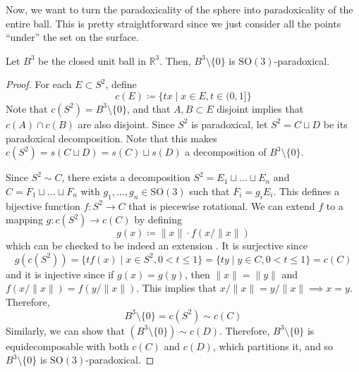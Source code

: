   Now, we want to turn the paradoxicality of the sphere into paradoxicality of the entire ball. This is pretty straightforward since we just consider all the points ``under'' the set on the surface. 

  \begin{theorem}
    \label{thm:paradoxical-punctured-ball}
    Let $B^3$ be the closed unit ball in $\mathbb{R}^3$. Then, $B^3 \setminus \{0\}$ is $\mathrm{SO}(3)$-paradoxical. 
  \end{theorem}
  \begin{proof}
    For each $E \subset S^2$, define 
    \begin{equation}
      c(E) \coloneqq \{ t x \mid x \in E, t \in (0, 1]\}
    \end{equation}
    Note that $c(S^2) = B^3 \setminus \{0\}$, and that $A, B \subset E$ disjoint implies that $c(A) \cap c(B)$ are also disjoint. Since $S^2$ is paradoxical, let $S^2 = C \sqcup D$ be its paradoxical decomposition. Note that this makes $c(S^2) = s(C \sqcup D) = s(C) \sqcup s(D)$ a decomposition of $B^3 \setminus \{0\}$. 

    Since $S^2 \sim C$, there exists a decomposition $S^2 = E_1 \sqcup \ldots \sqcup E_n$ and $C = F_1 \sqcup \ldots \sqcup F_n$ with $g_1, \ldots, g_n \in \mathrm{SO}(3)$ such that $F_i = g_i E_i$. This defines a bijective function $f: S^2 \to C$ that is piecewise rotational. We can extend $f$ to a mapping $g: c(S^2) \to c(C)$ by defining 
    \begin{equation}
      g(x) \coloneqq \|x\| \cdot f(x/\|x\|)
    \end{equation}
    which can be checked to be indeed an extension . It is surjective since 
    \begin{equation}
      g(c(S^2)) = \{t f(x) \mid x \in S^2, 0 < t \leq 1 \} = \{t y \mid y \in C, 0 < t \leq 1 \} = c(C)
    \end{equation}
    and it is injective since if $g(x) = g(y)$, then $\|x\| = \|y\|$ and $f(x/\|x\|) = f(y/\|x\|)$. This implies that $x / \|x\| = y / \|x\| \implies x = y$. Therefore, 
    \begin{equation}
      B^3 \setminus \{0\} = c(S^2) \sim c(C)
    \end{equation}
    Similarly, we can show that $(B^3 \setminus \{0\}) \sim c(D)$. Therefore, $B^3 \setminus \{0\}$ is equidecomposable with both $c(C)$ and $c(D)$, which partitions it, and so $B^3 \setminus \{0\}$ is $\mathrm{SO}(3)$-paradoxical. 
  \end{proof}

